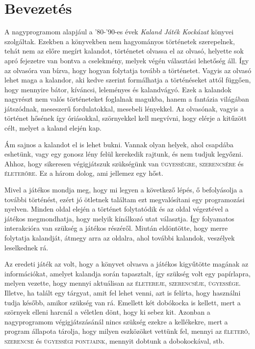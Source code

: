 \documentclass[12pt,a4paper,oneside]{report}
\newcommand{\stat}{\textsc}
\begin{document}

\tableofcontents

\newcommand{\chap}[1]{
  \addcontentsline{toc}{chapter}{#1}
  \addtocounter{chapter}{1}
  \setcounter{section}{0}
  \phantomsection
  \chapter*{#1}
}

\chapter*{Bevezetés}

  A nagyprogramom alapjául a '80-'90-es évek \emph{Kaland Játék Kockázat}
  könyvei szolgáltak. Ezekben a könyvekben nem hagyományos történetek
  szerepelnek, tehát nem az előre megírt kalandot, történetet olvassa el
  az olvasó, helyette sok apró fejezetre van bontva a cselekmény, melyek
  végén választási lehetőség áll. Így az olvasóra van bízva, hogy hogyan
  folytatja tovább a történetet. Vagyis az olvasó lehet maga a kalandor,
  aki kedve szerint formálhatja a történéseket attól függően, hogy
  mennyire bátor, kíváncsi, leleményes és kalandvágyó. Ezek a kalandok
  nagyrészt nem valós történeteket foglalnak magukba, hanem a fantázia
  világában játszódnak, meseszerű fordulatokkal, mesebeli lényekkel. Az
  olvasónak, vagyis a történet hősének így óriásokkal, szörnyekkel kell
  megvívni, hogy elérje a kitűzött célt, melyet a kaland elején kap.
  
  Ám sajnos a kalandot el is lehet bukni. Vannak olyan helyek, ahol
  csapdába eshetünk, vagy egy gonosz lény felül kerekedik rajtunk, és
  nem tudjuk legyőzni. Ahhoz, hogy sikeresen végigjátszuk szükségünk
  van \stat{ügyességre}, \stat{szerencsére} és \stat{életerőre}. Ez a
  három dolog, ami jellemez egy hőst.

  Mivel a játékos mondja meg, hogy mi legyen a következő lépés, ő
  befolyásolja a további történést, ezért jó ötletnek találtam ezt
  megvalósítani egy programozási nyelven. Minden oldal elején a történet
  folytatódik és az oldal végeztével a játékos megmondhatja, hogy
  melyik kínálkozó utat választja. Így folyamatos interakcióra van
  szükség a játékos részéről. Miután eldöntötte, hogy merre folytatja
  kalandját, átmegy arra az oldalra, ahol további kalandok, veszélyek
  leselkednek rá.
  
  Az eredeti játék az volt, hogy a könyvet olvasva a játékos
  kigyűtötte magának az információkat, amelyet kalandja során
  tapasztalt, így szükség volt egy papírlapra, melyen vezette, hogy
  mennyi aktuálisan az \stat{életereje}, \stat{szerencséje},
  \stat{ügyessége}. Illetve, ha talált egy tárgyat, amit fel lehet
  venni, azt is felírta, hogy használni tudja később, amikor szükség
  van rá. Emellett két dobókocka is kellett, mert a szörnyek elleni
  harcnál a véletlen dönt, hogy ki sebez kit. Azonban a nagyprogramom
  végigjátszásánál nincs szükség ezekre a kellékekre, mert a program
  állapota tárolja, hogy milyen eszközöket vettünk fel, mennyi az
  \stat{életerő}, \stat{szerencse} és \stat{ügyességi pontjaink},
  mennyit dobtunk a dobokockával, stb.
  
\end{document}
